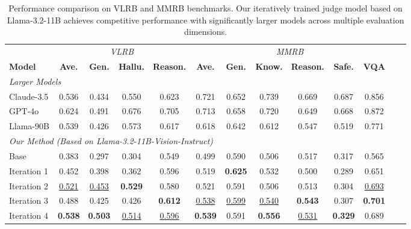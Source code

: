 \begin{table}[t]
\centering
\small
\setlength{\tabcolsep}{6pt}
\begin{tabular}{lcccccccccccc}
\toprule
 & \multicolumn{4}{c}{\textit{VLRB}} & \multicolumn{6}{c}{\textit{MMRB}} \\
\cmidrule(lr){2-5} \cmidrule(lr){6-11}
\textbf{Model} & \cellcolor{gray!20}\textbf{Ave.} & \textbf{Gen.} & \textbf{Hallu.} & \textbf{Reason.} & \cellcolor{gray!20}\textbf{Ave.} & \textbf{Gen.} & \textbf{Know.} & \textbf{Reason.} & \textbf{Safe.} & \textbf{VQA} \\
\midrule
\multicolumn{11}{l}{\textit{Larger Models}} \\
Claude-3.5 & \cellcolor{gray!20}0.536 & 0.434 & 0.550 & 0.623 & \cellcolor{gray!20}0.721 & 0.652 & 0.739 & 0.669 & 0.687 & 0.856 \\
GPT-4o & \cellcolor{gray!20}0.624 & 0.491 & 0.676 & 0.705 & \cellcolor{gray!20}0.713 & 0.658 & 0.720 & 0.649 & 0.668 & 0.872 \\
Llama-90B & \cellcolor{gray!20}0.539 & 0.426 & 0.573 & 0.617 & \cellcolor{gray!20}0.618 & 0.642 & 0.612 & 0.547 & 0.519 & 0.771 \\
\midrule
\multicolumn{11}{l}{\textit{Our Method (Based on Llama-3.2-11B-Vision-Instruct)}} \\
Base & \cellcolor{gray!20}0.383 & 0.297 & 0.304 & 0.549 & \cellcolor{gray!20}0.499 & 0.590 & 0.506 & 0.517 & 0.317 & 0.565 \\
Iteration 1 & \cellcolor{gray!20}0.452 & 0.398 & 0.362 & 0.596 & \cellcolor{gray!20}0.519 & \textbf{0.625} & 0.532 & 0.500 & 0.289 & 0.651 \\
Iteration 2 & \cellcolor{gray!20}\underline{0.521} & \underline{0.453} & \textbf{0.529} & 0.580 & \cellcolor{gray!20}0.521 & 0.591 & 0.506 & 0.513 & 0.304 & \underline{0.693} \\
Iteration 3 & \cellcolor{gray!20}0.488 & 0.425 & 0.426 & \textbf{0.612} & \cellcolor{gray!20}\underline{0.538} & \underline{0.599} & \underline{0.540} & \textbf{0.543} & 0.307 & \textbf{0.701} \\
Iteration 4 & \cellcolor{gray!20}\textbf{0.538} & \textbf{0.503} & \underline{0.514} & \underline{0.596} & \cellcolor{gray!20}\textbf{0.539} & 0.591 & \textbf{0.556} & \underline{0.531} & \textbf{0.329} & 0.689 \\
\bottomrule
\end{tabular}
\caption{Performance comparison on VLRB and MMRB benchmarks. Our iteratively trained judge model based on Llama-3.2-11B achieves competitive performance with significantly larger models across multiple evaluation dimensions.}
\label{tab:vlrb_mmrb_results}
\end{table}

